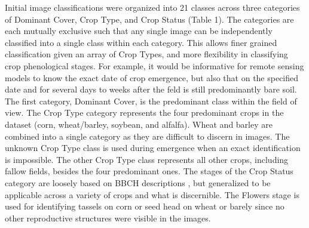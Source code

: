 \documentclass{article}
\begin{document}
Initial image classifications were organized into 21 classes across three categories of Dominant Cover, Crop Type, and Crop Status (Table 1). The categories are each mutually exclusive such that any single image can be independently classified into a single class within each category. This allows finer grained classification given an array of Crop Types, and more flexibility in classifying crop phenological stages. For example, it would be informative for remote sensing models to know the exact date of crop emergence, but also that on the specified date and for several days to weeks after the feld is still predominantly bare soil. The first category, Dominant Cover, is the predominant class within the field of view. The Crop Type category represents the four predominant crops in the dataset (corn, wheat/barley, soybean, and alfalfa). Wheat and barley are combined into a single category as they are difficult to discern in images. The unknown Crop Type class is used during emergence when an exact identification is impossible. The other Crop Type class represents all other crops, including fallow fields, besides the four predominant ones. The stages of the Crop Status category are loosely based on BBCH descriptions \citep{meier1997}, but generalized to be applicable across a variety of crops and what is discernible. The Flowers stage is used for identifying tassels on corn or seed head on wheat or barely since no other reproductive structures were visible in the images. 
\end{document}
